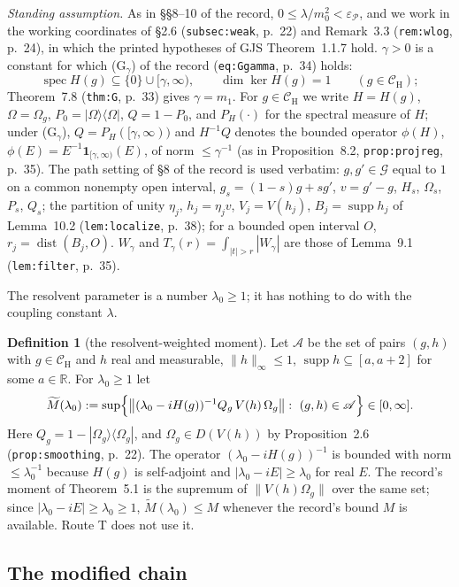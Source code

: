 \documentclass[11pt,a4paper]{article}
\newcommand{\R}{\mathbb{R}}
\newcommand{\G}{\mathcal{G}}
\newcommand{\CH}{\mathcal{C}_{\mathrm H}}
\newcommand{\Om}{\Omega}
\DeclareMathOperator{\supp}{supp}
\DeclareMathOperator{\dist}{dist}
\DeclareMathOperator{\spec}{spec}
\newcommand{\Mt}{\widetilde M}                %
\theoremstyle{plain}
\theoremstyle{definition}
\newtheorem{tdef}[tlemma]{Definition}
\begin{document}
\emph{Standing assumption.}  As in \S\S8--10 of the record, $0\le\lambda/m_0^2<\varepsilon_{\mathscr
P}$, and we work in the working coordinates of \S2.6 (\texttt{subsec:weak}, p.~22) and
Remark~3.3 (\texttt{rem:wlog}, p.~24), in which the printed hypotheses of GJS Theorem~1.1.7
hold.  $\gamma>0$ is a constant for which (G$_\gamma$) of the record (\texttt{eq:Ggamma},
p.~34) holds:
\[
 \spec H(g)\subseteq\{0\}\cup[\gamma,\infty),\qquad\dim\ker H(g)=1\qquad(g\in\CH);
\]
Theorem~7.8 (\texttt{thm:G}, p.~33) gives $\gamma=m_1$.  For $g\in\CH$ we write
$H=H(g)$, $\Om=\Om_g$, $P_0=|\Om\rangle\langle\Om|$, $Q=1-P_0$, and $P_H(\cdot)$ for the
spectral measure of $H$; under (G$_\gamma$), $Q=P_H([\gamma,\infty))$ and $H^{-1}Q$ denotes
the bounded operator $\phi(H)$, $\phi(E)=E^{-1}\mathbf 1_{[\gamma,\infty)}(E)$, of norm
$\le\gamma^{-1}$ (as in Proposition~8.2, \texttt{prop:projreg}, p.~35).  The path setting of
\S8 of the record is used verbatim: $g,g'\in\G$ equal to $1$ on a common nonempty open
interval, $g_s=(1-s)g+sg'$, $v=g'-g$, $H_s$, $\Om_s$, $P_s$, $Q_s$; the partition of unity
$\eta_j$, $h_j=\eta_jv$, $V_j=V(h_j)$, $B_j=\supp h_j$ of Lemma~10.2 (\texttt{lem:localize},
p.~38); for a bounded open interval $O$, $r_j=\dist(B_j,O)$.  $W_\gamma$ and
$T_\gamma(r)=\int_{|t|>r}|W_\gamma|$ are those of Lemma~9.1 (\texttt{lem:filter}, p.~35).

The resolvent parameter is a number $\lambda_0\ge1$; it has nothing to do with the coupling
constant $\lambda$.

\begin{tdef}[the resolvent-weighted moment]\label{def:Mt}
Let $\mathscr A$ be the set of pairs $(g,h)$ with $g\in\CH$ and $h$ real and measurable,
$\|h\|_\infty\le1$, $\supp h\subseteq[a,a+2]$ for some $a\in\R$.  For $\lambda_0\ge1$ let
\[
 \Mt(\lambda_0):=\sup\Bigl\{\bigl\|(\lambda_0-iH(g))^{-1}Q_g\,V(h)\,\Om_g\bigr\|:\
 (g,h)\in\mathscr A\Bigr\}\in[0,\infty] .
\]
Here $Q_g=1-|\Om_g\rangle\langle\Om_g|$, and $\Om_g\in D(V(h))$ by Proposition~2.6
(\texttt{prop:smoothing}, p.~22).  The operator $(\lambda_0-iH(g))^{-1}$ is bounded with norm
$\le\lambda_0^{-1}$ because $H(g)$ is self-adjoint and $|\lambda_0-iE|\ge\lambda_0$ for real
$E$.  The record's moment of Theorem~5.1 is the supremum of
$\|V(h)\Om_g\|$ over the same set; since $|\lambda_0-iE|\ge\lambda_0\ge1$,
$\Mt(\lambda_0)\le M$ whenever the record's bound $M$ is available.  Route T does not use it.
\end{tdef}

\subsection{The modified chain}\label{sec:chain}
\end{document}
